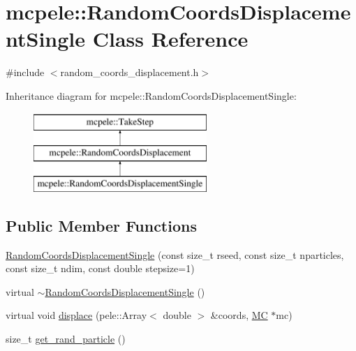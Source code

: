 \hypertarget{classmcpele_1_1RandomCoordsDisplacementSingle}{\section{mcpele\-:\-:\-Random\-Coords\-Displacement\-Single \-Class \-Reference}
\label{classmcpele_1_1RandomCoordsDisplacementSingle}
}


{\ttfamily \#include $<$random\-\_\-coords\-\_\-displacement.\-h$>$}

\-Inheritance diagram for mcpele\-:\-:\-Random\-Coords\-Displacement\-Single\-:\begin{figure}[H]
\begin{center}
\leavevmode
\includegraphics[height=3.000000cm]{classmcpele_1_1RandomCoordsDisplacementSingle}
\end{center}
\end{figure}
\subsection*{\-Public \-Member \-Functions}
\begin{DoxyCompactItemize}
\item 
\hyperlink{classmcpele_1_1RandomCoordsDisplacementSingle_a5a5ff549e6129c94d87bf4416f23574f}{\-Random\-Coords\-Displacement\-Single} (const size\-\_\-t rseed, const size\-\_\-t nparticles, const size\-\_\-t ndim, const double stepsize=1)
\item 
virtual \hyperlink{classmcpele_1_1RandomCoordsDisplacementSingle_a96c89a89af34b00f2705cd226e94142d}{$\sim$\-Random\-Coords\-Displacement\-Single} ()
\item 
virtual void \hyperlink{classmcpele_1_1RandomCoordsDisplacementSingle_a52c3271d105453d89024230f3f392dc7}{displace} (pele\-::\-Array$<$ double $>$ \&coords, \hyperlink{classmcpele_1_1MC}{\-M\-C} $\ast$mc)
\item 
size\-\_\-t \hyperlink{classmcpele_1_1RandomCoordsDisplacementSingle_a86f20835fae2527099165f24e894788b}{get\-\_\-rand\-\_\-particle} ()
\end{DoxyCompactItemize}


